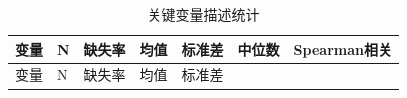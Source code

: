 \documentclass{sufethesismas}
\begin{document}
\begin{longtable}[]{@{}
  >{\raggedright\arraybackslash}p{}
  >{\raggedright\arraybackslash}p{}
  >{\raggedright\arraybackslash}p{}
  >{\raggedright\arraybackslash}p{}
  >{\raggedright\arraybackslash}p{}
  >{\raggedright\arraybackslash}p{}
  >{\raggedright\arraybackslash}p{}@{}}
\caption{关键变量描述统计}\tabularnewline
\toprule\noalign{}
\begin{minipage}[b]{\linewidth}\raggedright
变量
\end{minipage} & \begin{minipage}[b]{\linewidth}\raggedright
N
\end{minipage} & \begin{minipage}[b]{\linewidth}\raggedright
缺失率
\end{minipage} & \begin{minipage}[b]{\linewidth}\raggedright
均值
\end{minipage} & \begin{minipage}[b]{\linewidth}\raggedright
标准差
\end{minipage} & \begin{minipage}[b]{\linewidth}\raggedright
中位数
\end{minipage} & \begin{minipage}[b]{\linewidth}\raggedright
Spearman相关
\end{minipage} \\
\midrule\noalign{}
\endfirsthead
\toprule\noalign{}
\begin{minipage}[b]{\linewidth}\raggedright
变量
\end{minipage} & \begin{minipage}[b]{\linewidth}\raggedright
N
\end{minipage} & \begin{minipage}[b]{\linewidth}\raggedright
缺失率
\end{minipage} & \begin{minipage}[b]{\linewidth}\raggedright
均值
\end{minipage} & \begin{minipage}[b]{\linewidth}\raggedright
标准差
\end{minipage} & \begin{minipage}[b]{\linewidth}\raggedright

\end{minipage}
\end{longtable}
\end{document}
